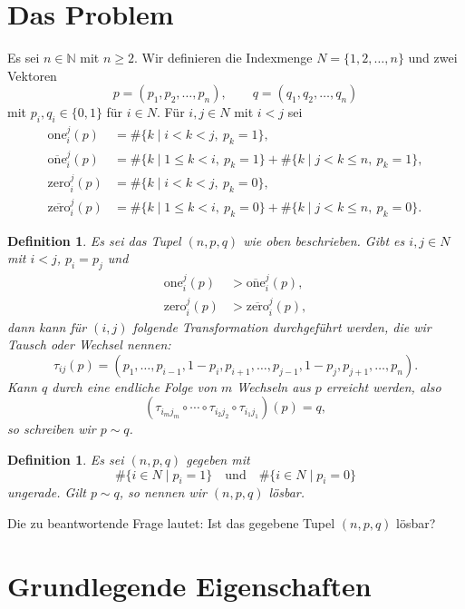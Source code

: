 \documentclass[12pt]{article}
\newtheorem{defn}[thm]{Definition}
\begin{document}
\section{Das Problem}

Es sei $n\in\mathbb{N}$ mit $n\geq 2$. Wir definieren die Indexmenge
$N=\{1,2,\dots,n\}$ und zwei Vektoren
\[
p=(p_1,p_2,\dots,p_n),
\qquad
q=(q_1,q_2,\dots,q_n)
\]
mit $p_i,q_i\in\{0,1\}$ für $i\in N$. Für $i,j\in N$ mit $i<j$ sei
\begin{align*}
\mathrm{one}_i^j(p)
&=\#\{k\mid i<k<j,\ p_k=1\},\\
\overline{\mathrm{one}}_i^j(p)
&=\#\{k\mid 1\leq k<i,\ p_k=1\}
 +\#\{k\mid j<k\leq n,\ p_k=1\},\\
\mathrm{zero}_i^j(p)
&=\#\{k\mid i<k<j,\ p_k=0\},\\
\overline{\mathrm{zero}}_i^j(p)
&=\#\{k\mid 1\leq k<i,\ p_k=0\}
 +\#\{k\mid j<k\leq n,\ p_k=0\}.
\end{align*}

\begin{defn}
Es sei das Tupel $(n,p,q)$ wie oben beschrieben. Gibt es $i,j\in N$ mit
$i<j$, $p_i=p_j$ und
\begin{align}
\mathrm{one}_i^j(p)
&>\overline{\mathrm{one}}_i^j(p),
\label{eq:ones-greater-original-notation}\\
\mathrm{zero}_i^j(p)
&>\overline{\mathrm{zero}}_i^j(p),
\label{eq:zeros-greater-original-notation}
\end{align}
dann kann für $(i,j)$ folgende Transformation durchgeführt werden, die wir
Tausch oder Wechsel nennen:
\[
\tau_{ij}(p)
=(p_1,\dots,p_{i-1},1-p_i,p_{i+1},\dots,
  p_{j-1},1-p_j,p_{j+1},\dots,p_n).
\]
Kann $q$ durch eine endliche Folge von $m$ Wechseln aus $p$ erreicht werden,
also
\[
(\tau_{i_mj_m}\circ\cdots\circ\tau_{i_2j_2}
 \circ\tau_{i_1j_1})(p)=q,
\]
so schreiben wir $p\sim q$.
\end{defn}

\begin{defn}
Es sei $(n,p,q)$ gegeben mit
\[
\#\{i\in N\mid p_i=1\}
\quad\text{und}\quad
\#\{i\in N\mid p_i=0\}
\]
ungerade. Gilt $p\sim q$, so nennen wir $(n,p,q)$ lösbar.
\label{defn:problembeschreibung-median}
\end{defn}

Die zu beantwortende Frage lautet: Ist das gegebene Tupel $(n,p,q)$ lösbar?

\section{Grundlegende Eigenschaften}
\end{document}
